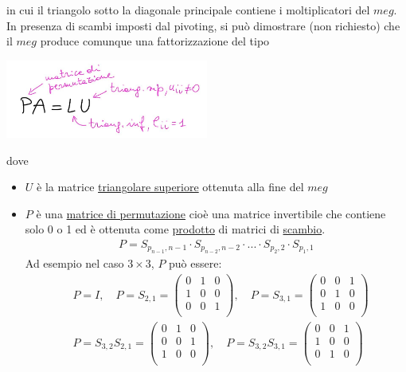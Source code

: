 \documentclass[12pt,a4paper]{article}
\begin{document}
in cui il triangolo sotto la diagonale principale contiene i moltiplicatori del $meg$.\\
In presenza di scambi imposti dal pivoting, si può dimostrare (non richiesto) che il $meg$ produce comunque una fattorizzazione del tipo
\begin{center}
    \includegraphics[width = 0.5\textwidth]{lez22_pag17.jpg}
\end{center}
dove
\begin{itemize}
    \item $U$ è la matrice \uline{triangolare superiore} ottenuta alla fine del $meg$
    \item $P$ è una \uline{matrice di permutazione}
cioè una matrice invertibile che contiene solo 0 o 1 ed è ottenuta come \uline{prodotto} di matrici di \uline{scambio}.
\[ \begin{split}
	P=S_{p_{n-1},n-1} \cdot S_{p_{n-2},n-2} \cdot ... \cdot S_{p_{2},2} \cdot S_{p_{1},1}
\end{split} \]
Ad esempio nel caso $3 \times 3$, $P$ può essere:
\[ \begin{split}
	& P=I, \quad P=S_{2,1}=
		\begin{pmatrix}
		0 & 1 & 0 \\
		1 & 0 & 0 \\
		0 & 0 & 1 \\
		\end{pmatrix}
	, \quad P=S_{3,1}=
		\begin{pmatrix}
		0 & 0 & 1 \\
		0 & 1 & 0 \\
		1 & 0 & 0 \\
		\end{pmatrix}
	\\
	& P=S_{3,2}S_{2,1}=
		\begin{pmatrix}
		0 & 1 & 0 \\
		0 & 0 & 1 \\
		1 & 0 & 0 \\
		\end{pmatrix}
	, \quad P=S_{3,2}S_{3,1}=
		\begin{pmatrix}
		0 & 0 & 1 \\
		1 & 0 & 0 \\
		0 & 1 & 0 \\

\end{pmatrix}
\end{split}\]
\end{itemize}
\end{document}
